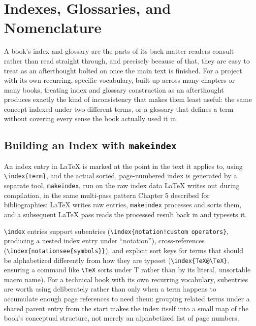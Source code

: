 \hypertarget{chapter-13-indexes-glossaries-and-nomenclature}{%
\chapter{Indexes, Glossaries, and Nomenclature}\label{chapter-13-indexes-glossaries-and-nomenclature}}

A book's index and glossary are the parts of its back matter readers consult rather than read straight through, and precisely because of that, they are easy to treat as an afterthought bolted on once the main text is finished. For a project with its own recurring, specific vocabulary, built up across many chapters or many books, treating index and glossary construction as an afterthought produces exactly the kind of inconsistency that makes them least useful: the same concept indexed under two different terms, or a glossary that defines a term without covering every sense the book actually used it in.

\hypertarget{building-an-index-with-makeindex}{%
\section{\texorpdfstring{Building an Index with \texttt{makeindex}}{Building an Index with makeindex}}\label{building-an-index-with-makeindex}}

An index entry in LaTeX is marked at the point in the text it applies to, using \texttt{\textbackslash{}index\{term\}}, and the actual sorted, page-numbered index is generated by a separate tool, \texttt{makeindex}, run on the raw index data LaTeX writes out during compilation, in the same multi-pass pattern Chapter 5 described for bibliographies: LaTeX writes raw entries, \texttt{makeindex} processes and sorts them, and a subsequent LaTeX pass reads the processed result back in and typesets it.

\texttt{\textbackslash{}index} entries support subentries (\texttt{\textbackslash{}index\{notation!custom\ operators\}}, producing a nested index entry under ``notation''), cross-references (\texttt{\textbackslash{}index\{notation\textbar{}see\{symbols\}\}}), and explicit sort keys for terms that should be alphabetized differently from how they are typeset (\texttt{\textbackslash{}index\{TeX@\textbackslash{}TeX\}}, ensuring a command like \texttt{\textbackslash{}TeX} sorts under T rather than by its literal, unsortable macro name). For a technical book with its own recurring vocabulary, subentries are worth using deliberately rather than only when a term happens to accumulate enough page references to need them: grouping related terms under a shared parent entry from the start makes the index itself into a small map of the book's conceptual structure, not merely an alphabetized list of page numbers.

